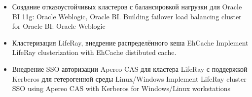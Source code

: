 \documentclass[11pt,a4paper,sans, russian]{moderncv}        %
\begin{document}
{\begin{itemize}
\begin{itemize}
				{Создание отказоустойчивых кластеров с балансировкой нагрузки для разрабатываемых Java-приложений: Corosync/Pacemaker, Nginx, Memcached, Apache Tomcat}
				{Desing and implementation of high loaded fault-tolerant clusters for business Java application: Corosync/Pacemaker, Nginx, Memcached, Apache Tomcat}
			\item {}
				{Создание отказоустойчивых кластеров с балансировкой нагрузки для Oracle BI 11g: Oracle Weblogic, Oracle BI.}
				{Building failover load balancing cluster for Oracle BI: Oracle Weblogic}
			\item {}
				{Кластеризация LifeRay, внедрение распределённого кеша EhCache}
				{Implement LifeRay clusterization with EhCache distibuted cache.}
			\item {}
				{Внедрение SSO авторизации Apereo CAS для кластера LifeRay с поддержкой Kerberos для гетерогенной среды Linux/Windows}
				{Implement LifeRay cluster SSO using Apereo CAS with Kerberos for Windows/Linux workstations}
		\end{itemize}
	\end{itemize}
}

\newpage

%
%
\end{document}
